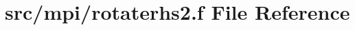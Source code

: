 \hypertarget{mpi_2rotaterhs2_8f}{\section{src/mpi/rotaterhs2.f File Reference}
\label{mpi_2rotaterhs2_8f}
}
